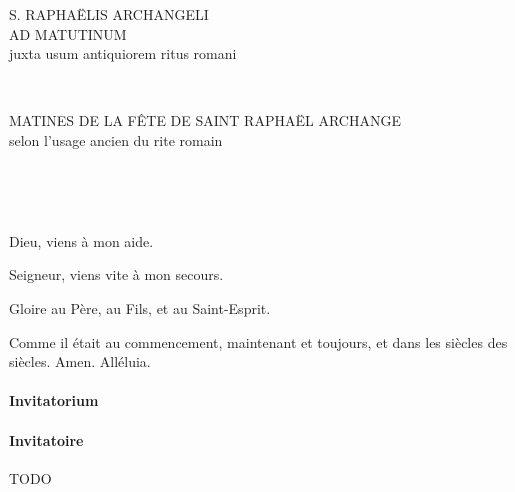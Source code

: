 \documentclass[twoside]{article}
\begin{document}
\null \newpage

\sloppy

\begin{paracol}[1]{2}

\begin{center}\begin{doublespace}

{
\MakeUppercase{\Large S. Raphaëlis Archangeli \\ ad Matutinum}\\
juxta usum antiquiorem ritus romani}
\end{doublespace}\end{center}


~~

\switchcolumn

\begin{center}\begin{doublespace}
{
\MakeUppercase{\Large Matines de la fête de Saint Raphaël Archange}\\
selon l'usage ancien du rite romain}
\end{doublespace}\end{center}

~~

~~

\vv Dieu, viens à mon aide.

\rr Seigneur, viens vite à mon secours.

\vv Gloire au Père, au Fils, et au Saint-Esprit.

\rr Comme il était au commencement, maintenant et toujours, et dans les siècles des siècles. Amen. Alléluia.

\switchcolumn*

\paragraph{Invitatorium}


\switchcolumn

\paragraph{Invitatoire}

TODO

\switchcolumn*


\end{paracol}
\end{document}
